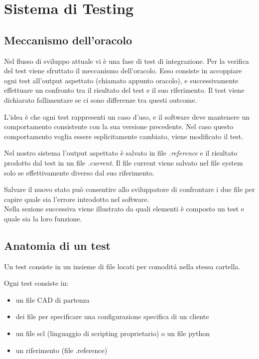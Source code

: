 \chapter{Sistema di Testing}
    \section{Meccanismo dell'oracolo\label{oracolo}}
        Nel flusso di sviluppo attuale vi è una fase di test di integrazione.
        Per la verifica del test viene sfruttato il meccanismo dell’oracolo.
        Esso consiste in accoppiare ogni test all'output aspettato (chiamato appunto oracolo),
        e successivamente effettuare un confronto tra il risultato del test e il suo riferimento.
        Il test viene dichiarato fallimentare se ci sono differenze tra questi outcome.
        
        L'idea è che ogni test rappresenti un caso d'uso, e il software deve mantenere un comportamento 
        consistente con la sua versione precedente.
        Nel caso questo comportamento voglia essere esplicitamente cambiato, viene modificato il test.

        Nel nostro sistema l'output aspettato è salvato in file \textit{.reference} e il risultato prodotto
        dal test in un file \textit{.current}.
        Il file current viene salvato nel file system solo se effettivamente diverso dal suo riferimento.
        
        Salvare il nuovo stato può consentire allo sviluppatore di confrontare i due file per capire quale sia l'errore introdotto nel software. \\
        Nella sezione successiva viene illustrato da quali elementi è composto un test e quale sia la loro funzione.
    \section{Anatomia di un test\label{testanatomy}}
        Un test consiste in un insieme di file locati per comodit\'a nella stessa cartella. 

        Ogni test consiste in:
        \begin{itemize}
            \item un file CAD di partenza
            \item dei file per specificare una configurazione specifica di un cliente
            \item un file scl (linguaggio di scripting proprietario) o un file python
            \item un riferimento (file .reference)
        \end{itemize}
